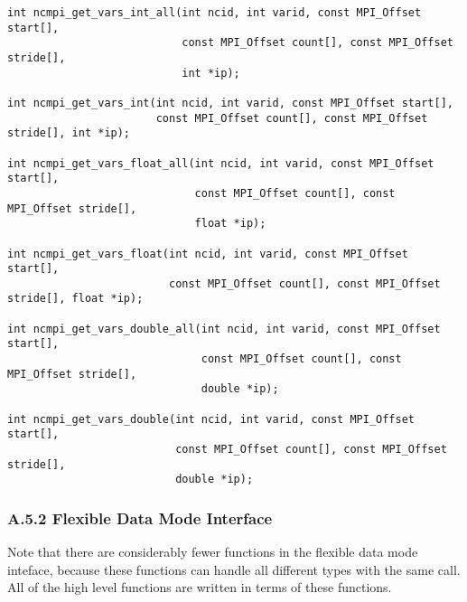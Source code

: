 \documentclass[10pt]{article}
\begin{document}
\begin{verbatim}
int ncmpi_get_vars_int_all(int ncid, int varid, const MPI_Offset start[],
                           const MPI_Offset count[], const MPI_Offset stride[],
                           int *ip);

int ncmpi_get_vars_int(int ncid, int varid, const MPI_Offset start[],
                       const MPI_Offset count[], const MPI_Offset stride[], int *ip);

int ncmpi_get_vars_float_all(int ncid, int varid, const MPI_Offset start[],
                             const MPI_Offset count[], const MPI_Offset stride[],
                             float *ip);

int ncmpi_get_vars_float(int ncid, int varid, const MPI_Offset start[],
                         const MPI_Offset count[], const MPI_Offset stride[], float *ip);

int ncmpi_get_vars_double_all(int ncid, int varid, const MPI_Offset start[],
                              const MPI_Offset count[], const MPI_Offset stride[],
                              double *ip);

int ncmpi_get_vars_double(int ncid, int varid, const MPI_Offset start[],
                          const MPI_Offset count[], const MPI_Offset stride[],
                          double *ip);
\end{verbatim}

\subsubsection*{A.5.2  Flexible Data Mode Interface}

Note that there are considerably fewer functions in the flexible data mode
inteface, because these functions can handle all different types with the same
call.  All of the high level functions are written in terms of these
functions.
\end{document}
